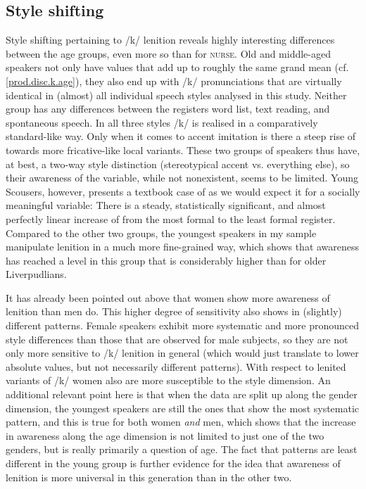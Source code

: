 \subsection{Style shifting}
\label{prod.disc.k.style}

Style shifting pertaining to /k/ lenition reveals highly interesting differences between the age groups, even more so than for \textsc{nurse}.
Old and middle-aged speakers not only have  values that add up to roughly the same grand mean (cf. \ref{prod.disc.k.age}), they also end up with /k/ pronunciations that are virtually identical in (almost) all individual speech styles analysed in this study.
Neither group has any differences between the registers word list, text reading, and spontaneous speech.
In all three styles /k/ is realised in a comparatively standard-like way.
Only when it comes to accent imitation is there a steep rise of  towards more fricative-like local variants.
These two groups of speakers thus have, at best, a two-way style distinction (stereotypical accent vs. everything else), so their awareness of the variable, while not nonexistent, seems to be limited.
Young Scousers, however, presents a textbook case of  as we would expect it for a socially meaningful variable: There is a steady, statistically significant, and almost perfectly linear increase of  from the most formal to the least formal register.
Compared to the other two groups, the youngest speakers in my sample manipulate lenition in a much more fine-grained way, which shows that awareness has reached a level in this group that is considerably higher than for older Liverpudlians.

It has already been pointed out above that women show more awareness of lenition than men do.
This higher degree of sensitivity also shows in (slightly) different  patterns.
Female speakers exhibit more systematic and more pronounced style differences than those that are observed for male subjects, so they are not only more sensitive to /k/ lenition in general (which would just translate to lower absolute  values, but not necessarily different  patterns).
With respect to lenited variants of /k/ women also are more susceptible to the style dimension.
An additional relevant point here is that when the data are split up along the gender dimension, the youngest speakers are still the ones that show the most systematic  pattern, and this is true for both women \emph{and} men, which shows that the increase in awareness along the age dimension is not limited to just one of the two genders, but is really primarily a question of age.
The fact that  patterns are least different in the young group is further evidence for the idea that awareness of lenition is more universal in this generation than in the other two.

